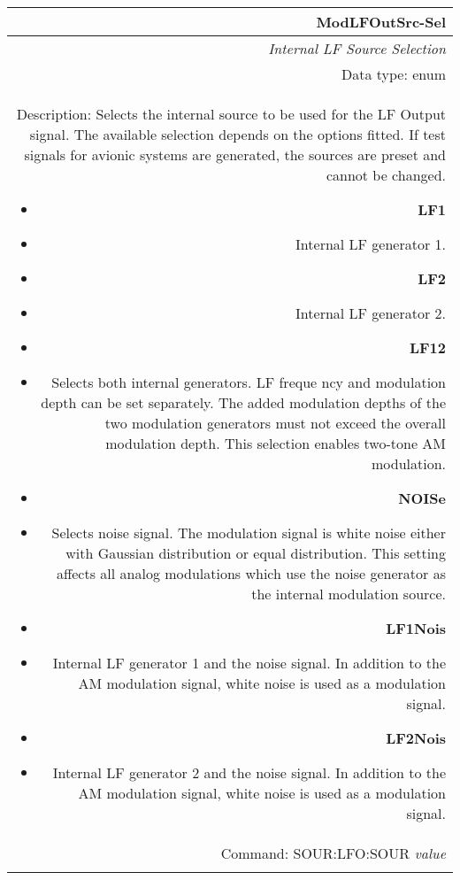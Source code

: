 \documentclass[openany]{article}
\begin{document}
		\begin{tabular}{N}
			\hline
			\bfseries ModLFOutSrc-Sel \\ \hline
			\emph{Internal LF Source Selection} \\
			Data type: enum \\  
			Description: Selects the internal source to be used for the LF Output signal. The available selection depends on the options fitted. If test signals for avionic systems are generated, the sources are preset and cannot be changed. \begin{itemize}[noitemsep]
				\small
                                \item[] \textbf{LF1}
                                \item[] Internal LF generator 1.
                                \item[] \textbf{LF2}
                                \item[] Internal LF generator 2.
                                \item[] \textbf{LF12}
                                \item[] Selects both internal generators. LF freque     ncy and modulation depth can be set separately. The added modulation depths of the two modulation generators must not exceed the overall modulation depth. This selection enables two-tone AM modulation.
                                \item[] \textbf{NOISe}
                                \item[] Selects noise signal. The modulation signal      is white noise either with Gaussian distribution or equal distribution. This setting affects all analog modulations which use the noise generator as the internal modulation source.
                                \item[] \textbf{LF1Nois}
                                \item[] Internal LF generator 1 and the noise signal. In addition to the AM modulation signal, white noise is used as a modulation signal.
                                \item[] \textbf{LF2Nois}
                                \item[] Internal LF generator 2 and the noise signal. In addition to the AM modulation signal, white noise is used as a modulation signal.
			\end{itemize} \\
			Command: SOUR:LFO:SOUR \emph{value} \\
			\\

		\end{tabular}
\end{document}
